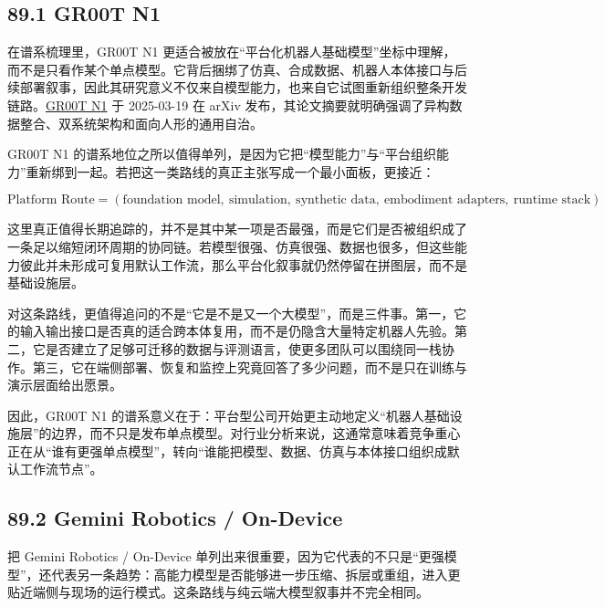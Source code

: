 \subsection*{89.1 GR00T N1}


在谱系梳理里，GR00T N1 更适合被放在“平台化机器人基础模型”坐标中理解，而不是只看作某个单点模型。它背后捆绑了仿真、合成数据、机器人本体接口与后续部署叙事，因此其研究意义不仅来自模型能力，也来自它试图重新组织整条开发链路。\href{https://arxiv.org/abs/2503.14734}{GR00T N1} 于 2025-03-19 在 arXiv 发布，其论文摘要就明确强调了异构数据整合、双系统架构和面向人形的通用自治。

GR00T N1 的谱系地位之所以值得单列，是因为它把“模型能力”与“平台组织能力”重新绑到一起。若把这一类路线的真正主张写成一个最小面板，更接近：

\begingroup
\scriptsize
\begin{equation*}
\text{Platform Route} = (\text{foundation model},\ \text{simulation},\ \text{synthetic data},\ \text{embodiment adapters},\ \text{runtime stack})
\end{equation*}
\endgroup

这里真正值得长期追踪的，并不是其中某一项是否最强，而是它们是否被组织成了一条足以缩短闭环周期的协同链。若模型很强、仿真很强、数据也很多，但这些能力彼此并未形成可复用默认工作流，那么平台化叙事就仍然停留在拼图层，而不是基础设施层。

对这条路线，更值得追问的不是“它是不是又一个大模型”，而是三件事。第一，它的输入输出接口是否真的适合跨本体复用，而不是仍隐含大量特定机器人先验。第二，它是否建立了足够可迁移的数据与评测语言，使更多团队可以围绕同一栈协作。第三，它在端侧部署、恢复和监控上究竟回答了多少问题，而不是只在训练与演示层面给出愿景。

因此，GR00T N1 的谱系意义在于：平台型公司开始更主动地定义“机器人基础设施层”的边界，而不只是发布单点模型。对行业分析来说，这通常意味着竞争重心正在从“谁有更强单点模型”，转向“谁能把模型、数据、仿真与本体接口组织成默认工作流节点”。

\subsection*{89.2 Gemini Robotics / On-Device}


把 Gemini Robotics / On-Device 单列出来很重要，因为它代表的不只是“更强模型”，还代表另一条趋势：高能力模型是否能够进一步压缩、拆层或重组，进入更贴近端侧与现场的运行模式。这条路线与纯云端大模型叙事并不完全相同。

